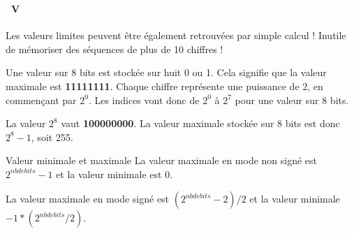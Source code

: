\begin{frame}
  \frametitle{\secname}
  \framesubtitle{\subsecname~V}
  
  \par
  Les valeurs limites peuvent être également retrouvées par simple calcul ! Inutile de mémoriser des séquences de plus de 10 chiffres !
  \vspace{0.2cm}
  \par
  Une valeur sur 8 bits est stockée sur huit 0 ou 1. Cela signifie que la valeur maximale est \textbf{11111111}. Chaque chiffre représente une puissance de 2, en commençant par $2^{0}$. Les indices vont donc de $2^{0}$ à $2^{7}$ pour une valeur sur 8 bits.
  \vspace{0.2cm}
  \par
  La valeur $2^{8}$ vaut \textbf{100000000}. La valeur maximale stockée sur 8 bits est donc $2^{8} - 1$, soit 255.
  \begin{block}{Valeur minimale et maximale}
    La valeur maximale en mode non signé est $2^{nb de bits} - 1$ et la valeur minimale est 0.
    \vspace{0.2cm}
    \par
    La valeur maximale en mode signé est $(2^{nb de bits} - 2)/2$ et la valeur minimale $-1 * (2^{nb de bits} / 2)$.
  \end{block}
\end{frame}

